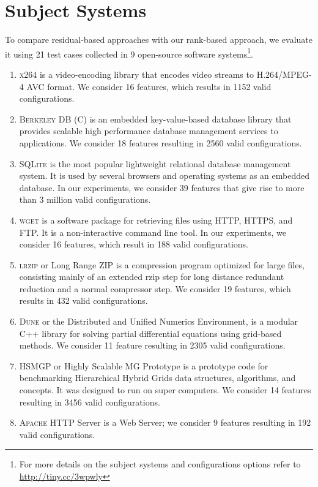\section{Subject Systems}\label{sec:systems}
To compare residual-based approaches with our rank-based approach, we evaluate it using 21 test cases collected in 9 open-source software systems\footnote{For more details on the subject systems and configurations options refer to \url{http://tiny.cc/3wpwly}}. 
\begin{enumerate}
 \item {} \textsc{x264} is a video-encoding library that encodes video streams to H.264/MPEG-4 AVC format. We consider 16 features, which results in 1152 valid configurations.
 
 \item {} \textsc{Berkeley DB (C)} is an embedded key-value-based database library that provides scalable high performance database management services to applications. We consider 18 features resulting in 2560 valid configurations.
 
 \item {} \textsc{SQLite} is the most popular lightweight relational database management system. It is used by several browsers and operating systems as an embedded database. In our experiments, we consider 39 features that give rise to more than 3 million valid configurations.
 
 \item {} \textsc{wget} is a software package for retrieving files using HTTP, HTTPS, and FTP. It is a non-interactive command line tool. In our experiments, we consider 16 features, which result in 188 valid configurations.

\item {} \textsc{lrzip} or Long Range ZIP is a compression program optimized for large files, consisting mainly of an extended rzip step for long distance redundant reduction and a normal compressor step. We consider 19 features, which results in 432 valid configurations.


\item {} \textsc{Dune} or the Distributed and Unified Numerics Environment, is a modular C++ library for solving partial differential equations using grid-based methods. We consider 11 feature resulting in 2305 valid configurations.

\item {} \textsc{HSMGP} or Highly Scalable MG Prototype is a prototype code for benchmarking Hierarchical Hybrid Grids data structures, algorithms, and concepts. It was designed to run on super computers. We consider 14 features resulting in 3456 valid configurations.

\item {} \textsc{Apache} HTTP Server is a Web Server; we consider 9 features resulting in 192 valid configurations.     
   
    

\end{enumerate}

